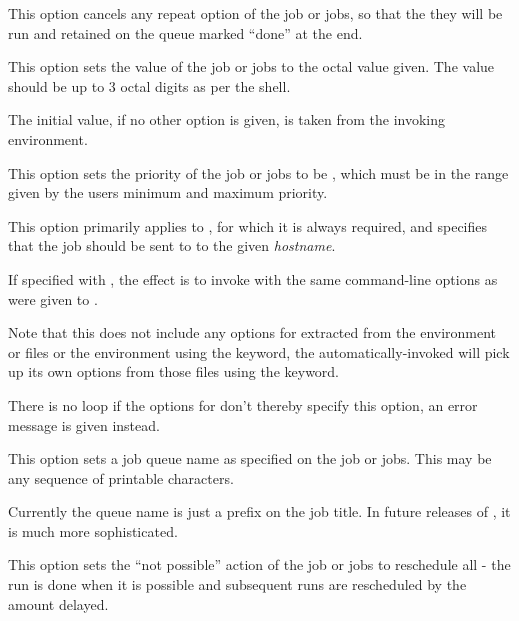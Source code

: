 
This option cancels any repeat option of the job or jobs, so that the they will be run and retained on the queue marked ``done'' at the end.


This option sets the  value of the job or jobs to the octal value given. The value should be up to 3 octal digits as
per the shell.

The initial value, if no other option is given, is taken from the invoking environment.


This option sets the priority of the job or jobs to be , which must be in the range given by the user{\textquotesingle}s minimum
and maximum priority.


This option primarily applies to \PrRbtr{}, for which it is always required, and specifies that the job should
be sent to to the given \textit{hostname}.

If specified with \PrBtr{}, the effect is to invoke \PrRbtr{} with the same command-line options as were given to \PrBtr{}.

Note that this does not include any options for \PrBtr{} extracted from the environment or \configurationfile{} files or the environment using the
\filename{\BtrVarname} keyword, the automatically-invoked \PrRbtr{} will pick up its own options from those files using the \filename{\RbtrVarname} keyword.

There is no loop if the options for \PrRbtr{} don't thereby specify this option, an error message is given instead.


This option sets a job queue name as specified on the job or jobs. This may be any sequence of printable characters.

Currently the queue name is just a prefix on the job title. In future releases of \ProductName{}, it is much more sophisticated.


This option sets the ``not possible'' action of the job or jobs to reschedule all - the run is done when it is possible
and subsequent runs are rescheduled by the amount delayed.

